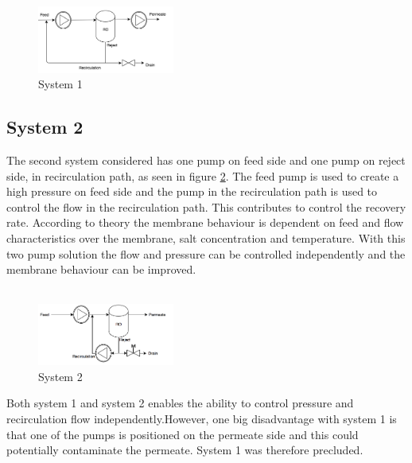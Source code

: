 \begin{figure}[h]
    \centering
    \includegraphics[width=0.4\textwidth]{FlowCInves1}
    \caption{System 1}
    \label{fig:FlowCInves1}
\end{figure}

\subsection{System 2}
The second system considered has one pump on feed side and one pump on reject side, in recirculation path, as seen in figure \ref{fig:Sys2}. The feed pump is used to create a high pressure on feed side and the pump in the recirculation path is used to control the flow in the recirculation path. This contributes to control the recovery rate. According to theory the membrane behaviour is dependent on feed and flow characteristics over the membrane, salt concentration and temperature. With this two pump solution the flow and pressure can be controlled independently and the membrane behaviour can be improved. \\
\\
\begin{figure}[h]
    \centering
    \includegraphics[width=0.4\textwidth]{Sys2}
    \caption{System 2}
    \label{fig:Sys2}
\end{figure}
Both system 1 and system 2 enables the ability to control pressure and recirculation flow independently.However, one big disadvantage with system 1 is that one of the pumps is positioned on the  permeate side and this could potentially contaminate the permeate. System 1 was therefore precluded.

